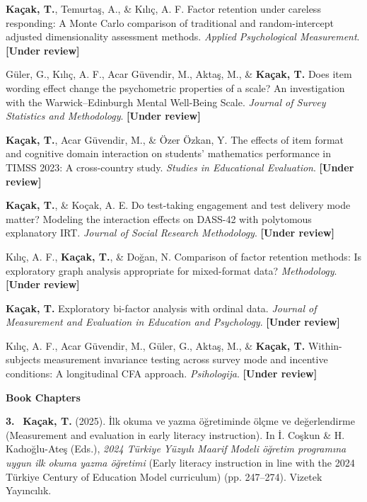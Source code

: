 \documentclass[10pt,a4paper]{article}
\newcommand{\me}[1]{\textbf{\color{headwhite}#1}}
\newcommand{\cvtag}[2]{\textcolor{#1}{\small\textbf{[#2]}}}
\newcommand{\pubnum}[1]{\textbf{\color{headwhite}#1.}~}
\begin{document}
\me{Kaçak, T.}, Temurtaş, A., \& Kılıç, A. F. Factor retention under careless responding: A Monte Carlo comparison of traditional and random-intercept adjusted dimensionality assessment methods. \textit{Applied Psychological Measurement}. \cvtag{tagreview}{Under review}
\vspace{5pt}

G\"uler, G., Kılıç, A. F., Acar G\"uvendir, M., Aktaş, M., \& \me{Kaçak, T.} Does item wording effect change the psychometric properties of a scale? An investigation with the Warwick--Edinburgh Mental Well-Being Scale. \textit{Journal of Survey Statistics and Methodology}. \cvtag{tagreview}{Under review}
\vspace{5pt}

\me{Kaçak, T.}, Acar G\"uvendir, M., \& \"Ozer \"Ozkan, Y. The effects of item format and cognitive domain interaction on students' mathematics performance in TIMSS 2023: A cross-country study. \textit{Studies in Educational Evaluation}. \cvtag{tagreview}{Under review}
\vspace{5pt}

\me{Kaçak, T.}, \& Koçak, A. E. Do test-taking engagement and test delivery mode matter? Modeling the interaction effects on DASS-42 with polytomous explanatory IRT. \textit{Journal of Social Research Methodology}. \cvtag{tagreview}{Under review}
\vspace{5pt}

Kılıç, A. F., \me{Kaçak, T.}, \& Do\u{g}an, N. Comparison of factor retention methods: Is exploratory graph analysis appropriate for mixed-format data? \textit{Methodology}. \cvtag{tagreview}{Under review}
\vspace{5pt}

\me{Kaçak, T.} Exploratory bi-factor analysis with ordinal data. \textit{Journal of Measurement and Evaluation in Education and Psychology}. \cvtag{tagreview}{Under review}
\vspace{5pt}

Kılıç, A. F., Acar G\"uvendir, M., G\"uler, G., Aktaş, M., \& \me{Kaçak, T.} Within-subjects measurement invariance testing across survey mode and incentive conditions: A longitudinal CFA approach. \textit{Psihologija}. \cvtag{tagreview}{Under review}

\vspace{10pt}
{\color{headwhite}\bfseries\normalsize Book Chapters}
\vspace{4pt}

\pubnum{3} \me{Kaçak, T.} (2025). İlk okuma ve yazma \"o\u{g}retiminde \"ol\c{c}me ve de\u{g}erlendirme (Measurement and evaluation in early literacy instruction). In İ. Coşkun \& H. Kadıo\u{g}lu-Ateş (Eds.), \textit{2024 T\"urkiye Y\"uzyılı Maarif Modeli \"o\u{g}retim programına uygun ilk okuma yazma \"o\u{g}retimi} (Early literacy instruction in line with the 2024 T\"urkiye Century of Education Model curriculum) (pp. 247--274). Vizetek Yayıncılık.
\vspace{6pt}
\end{document}
